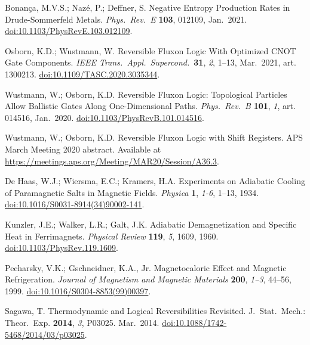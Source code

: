 \documentclass[preprints,article,accept,moreauthors,pdftex]{Definitions/mdpi}
\begin{document}
\begin{thebibliography}{999}
Bonança, M.V.S.; Nazé, P.; Deffner, S\@. Negative Entropy Production Rates in Drude-Sommerfeld Metals. {\em Phys.\ Rev.\ E} {\bf 103}, 012109, Jan.\ 2021. \href{https://doi.org/10.1103/PhysRevE.103.012109}{doi:10.1103/PhysRevE.103.012109}.

Osborn, K.D.; Wustmann, W\@. Reversible Fluxon Logic With Optimized CNOT Gate Components. {\em IEEE Trans.\ Appl.\ Supercond.}\ {\bf 31}, {\em 2}, 1--13, Mar.\ 2021, art. 1300213. \href{https://doi.org/10.1109/TASC.2020.3035344}{doi:10.1109/TASC.2020.3035344}.

Wustmann, W.; Osborn, K.D\@. Reversible Fluxon Logic: Topological Particles Allow Ballistic Gates Along One-Dimensional Paths. {\em Phys.\ Rev.\ B} {\bf 101}, {\em 1}, art. 014516, Jan.\ 2020. \href{https://doi.org/10.1103/PhysRevB.101.014516}{doi:10.1103/PhysRevB.101.014516}.

Wustmann, W.; Osborn, K.D\@. Reversible Fluxon Logic with Shift Registers. APS March Meeting 2020 abstract. Available at \href{https://meetings.aps.org/Meeting/MAR20/Session/A36.3}{https://meetings.aps.org/Meeting/MAR20/Session/A36.3}.

De Haas, W.J.; Wiersma, E.C.; Kramers, H.A\@. Experiments on Adiabatic Cooling of Paramagnetic Salts in Magnetic Fields. {\em Physica} {\bf 1}, {\em 1-6}, 1--13, 1934. \href{https://doi.org/10.1016/S0031-8914(34)90002-141}{doi:10.1016/S0031-8914(34)90002-141}.

Kunzler, J.E.; Walker, L.R.; Galt, J.K\@. Adiabatic Demagnetization and Specific Heat in Ferrimagnets. {\em Physical Review} {\bf 119}, {\em 5}, 1609, 1960. \href{https://doi.org/10.1103/PhysRev.119.1609}{doi:10.1103/PhysRev.119.1609}.  

Pecharsky, V.K.; Gschneidner, K.A., Jr. Magnetocaloric Effect and Magnetic Refrigeration. {\em Journal of Magnetism and Magnetic Materials} {\bf 200}, {\em 1--3}, 44--56, 1999. \href{https://doi.org/10.1016/S0304-8853(99)00397}{doi:10.1016/S0304-8853(99)00397}.

Sagawa, T\@. Thermodynamic and Logical Reversibilities Revisited. {J.\ Stat.\ Mech.: Theor.\ Exp.} {\bf 2014}, {\em 3}, P03025.  Mar.\ 2014. \href{https://doi.org/10.1088/1742-5468/2014/03/p03025}{doi:10.1088/1742-5468/2014/03/p03025}.


\end{thebibliography}
\end{document}
